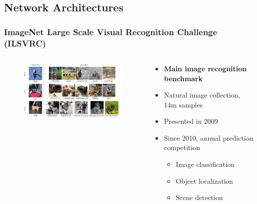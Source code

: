 \documentclass[aspectratio=1610]{beamer}
\newcommand\imageright[1]{ %
    \caption*{\scalebox{.5}{\textcolor{lightgray}{\textcopyright~#1}}} %
}
\begin{document}
\subsection{Network Architectures}
\label{subsec:network-architectures}

\begin{frame}
\frametitle{ImageNet Large Scale Visual Recognition Challenge (ILSVRC)}

\begin{columns}
    \begin{column}{0.48\textwidth}
        \begin{figure}
            \includegraphics[width=\linewidth]{ilsvrc.jpg}
            \imageright{Oren Kraus}
        \end{figure}
    \end{column}
    \begin{column}{0.48\textwidth}
        \begin{itemize}
            \item \textbf{Main image recognition benchmark}
            \item Natural image collection, 14m samples
            \item Presented in 2009
            \item Since 2010, annual prediction competition
            \begin{itemize}
                \item Image classification
                \item Object localization
                \item Scene detection
            \end{itemize}
        \end{itemize}
    \end{column}
\end{columns}
\end{frame}
\end{document}
